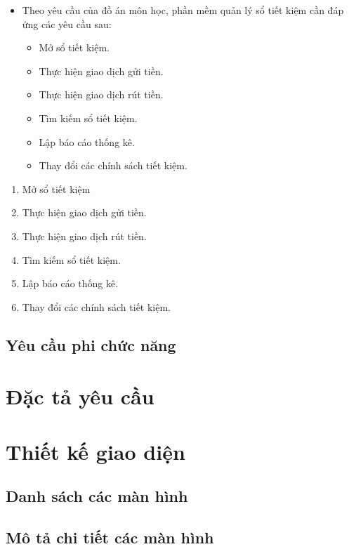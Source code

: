 \documentclass{article}
\begin{document}
		\begin{itemize}
			\item Theo yêu cầu của đồ án môn học, phần mềm quản lý sổ tiết kiệm cần đáp ứng các yêu cầu sau:
			\begin{itemize}
				\item Mở sổ tiết kiệm.
				\item Thực hiện giao dịch gửi tiền.
				\item Thực hiện giao dịch rút tiền.
				\item Tìm kiếm sổ tiết kiệm.
				\item Lập báo cáo thống kê.
				\item Thay đổi các chính sách tiết kiệm.
			\end{itemize}		
		\end{itemize}
		
		\begin{enumerate}
			\item Mở sổ tiết kiệm
			\item Thực hiện giao dịch gửi tiền.
			\item Thực hiện giao dịch rút tiền.
			\item Tìm kiếm sổ tiết kiệm.
			\item Lập báo cáo thống kê.
			\item Thay đổi các chính sách tiết kiệm.
		\end{enumerate}
		
		
	
	\subsection{Yêu cầu phi chức năng}
	
	\section{Đặc tả yêu cầu}
	
	\section{Thiết kế giao diện}
	\subsection{Danh sách các màn hình}
	\subsection{Mô tả chi tiết các màn hình}
	
\end{document}
